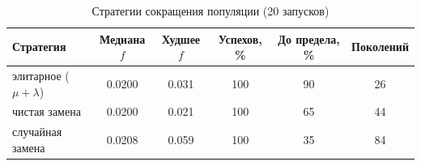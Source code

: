 \begin{table}[H]
\caption{Стратегии сокращения популяции (20 запусков)}
\label{tab:reduction}
\centering
\small
\begin{tabular}{lccccc}
\toprule
Стратегия & Медиана $f$ & Худшее $f$ & Успехов, \% & До предела, \% & Поколений \\
\midrule
элитарное ($\mu+\lambda$) & 0.0200 & 0.031 & 100 & 90 & 26 \\
чистая замена & 0.0200 & 0.021 & 100 & 65 & 44 \\
случайная замена & 0.0208 & 0.059 & 100 & 35 & 84 \\
\bottomrule
\end{tabular}
\end{table}
